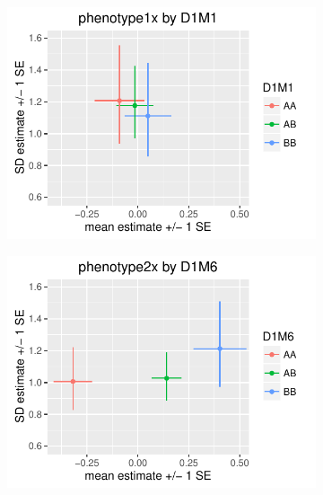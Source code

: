 \documentclass[9pt,twocolumn,twoside]{gsag3jnl}
\begin{document}
\begin{figure}[htbp]
    \begin{subfigure}[t]{0.24\textwidth}
        \includegraphics[width=\textwidth]{images/mean_var_plot_phen1x.pdf}
    \end{subfigure}
    \hfill
    \begin{subfigure}[t]{0.24\textwidth}
        \includegraphics[width=\textwidth]{images/mean_var_plot_phen2x.pdf}
    \end{subfigure}


\end{figure}
\end{document}
